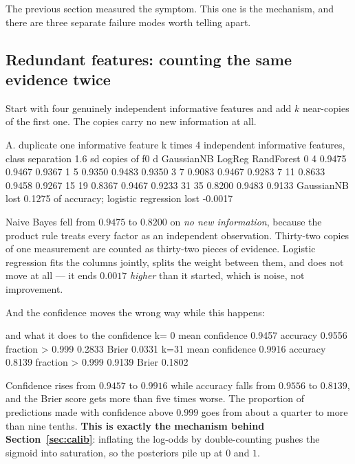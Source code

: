 \documentclass[11pt]{article}
\begin{document}
The previous section measured the symptom. This one is the mechanism, and
there are three separate failure modes worth telling apart.

\subsection{Redundant features: counting the same evidence twice}

Start with four genuinely independent informative features and add $k$
near-copies of the first one. The copies carry no new information at all.

\begin{codeout}
A. duplicate one informative feature k times
   4 independent informative features, class separation 1.6 sd
    copies of f0    d  GaussianNB    LogReg  RandForest
               0    4      0.9475    0.9467      0.9367
               1    5      0.9350    0.9483      0.9350
               3    7      0.9083    0.9467      0.9283
               7   11      0.8633    0.9458      0.9267
              15   19      0.8367    0.9467      0.9233
              31   35      0.8200    0.9483      0.9133
   GaussianNB lost 0.1275 of accuracy; logistic regression lost -0.0017
\end{codeout}

\begin{keyidea}
Naive Bayes fell from $0.9475$ to $0.8200$ on \emph{no new information},
because the product rule treats every factor as an independent observation.
Thirty-two copies of one measurement are counted as thirty-two pieces of
evidence. Logistic regression fits the columns jointly, splits the weight
between them, and does not move at all --- it ends $0.0017$
\emph{higher} than it started, which is noise, not improvement.
\end{keyidea}

And the confidence moves the wrong way while this happens:

\begin{codeout}
   and what it does to the confidence
      k= 0  mean confidence 0.9457   accuracy 0.9556   fraction > 0.999 0.2833   Brier 0.0331
      k=31  mean confidence 0.9916   accuracy 0.8139   fraction > 0.999 0.9139   Brier 0.1802
\end{codeout}

Confidence rises from $0.9457$ to $0.9916$ while accuracy falls from $0.9556$
to $0.8139$, and the Brier score gets more than five times worse. The
proportion of predictions made with confidence above $0.999$ goes from about
a quarter to more than nine tenths. \textbf{This
is exactly the mechanism behind Section~\ref{sec:calib}}: inflating the
log-odds by double-counting pushes the sigmoid into saturation, so the
posteriors pile up at $0$ and $1$.
\end{document}
